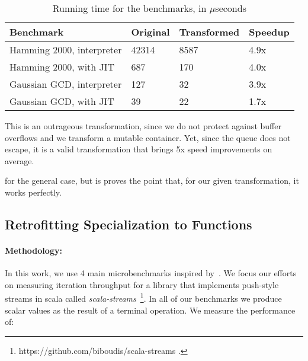\begin{table}
  \begin{tabularx}{\textwidth}{|g *{3}{|Y}|} \hline
    \textbf{Benchmark}        &  \textbf{Original}  & \textbf{Transformed} &      \textbf{Speedup} \\ \hline
    Hamming 2000, interpreter &                    42314 &                     8587 &                   4.9x \\
    Hamming 2000, with JIT    &                      687 &                      170 &                   4.0x \\
    Gaussian GCD, interpreter &                      127 &                       32 &                   3.9x \\
    Gaussian GCD, with JIT    &                       39 &                       22 &                   1.7x \\ \hline
  \end{tabularx}
  \caption{Running time for the benchmarks, in $\mu$seconds}
  \label{table:adrt}
  \vspace{-10mm}
\end{table}

This is an outrageous transformation, since we do not protect against buffer overflows and we transform a mutable container. Yet, since the queue does not escape, it is a valid transformation that brings 5x speed improvements on average.

 for the general case, but is proves the point that, for our given transformation, it works perfectly.

\subsection{Retrofitting Specialization to Functions}
\label{sec:benchmarks:funcs}

\paragraph{Methodology: } In this work, we use 4 main microbenchmarks inspired
by~\cite{biboudis_clash_2014}. We focus our efforts on measuring iteration
throughput for a library that implements push-style streams in scala called
\emph{scala-streams}~\footnote{https://github.com/biboudis/scala-streams .}. In
all of our benchmarks we produce scalar values as the result of a terminal
operation. We measure the performance of:

